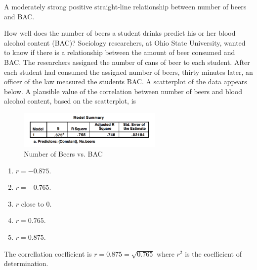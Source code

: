 \documentclass[11pt, chapterprefix=true]{scrbook}\usepackage[]{graphicx}\usepackage[]{color}
\begin{document}
\begin{exercises}
\begin{exercise}
  \end{exercise}
  \vspace{2mm}
  \begin{solution}
    A moderately strong positive straight-line relationship between number of beers and BAC.
  \end{solution}

  \begin{exercise} %

    How well does the number of beers a student drinks predict his or her
blood alcohol content (BAC)? Sociology researchers, at Ohio State University, wanted to know if there is a relationship between the amount of beer consumed and BAC. The researchers assigned the number of cans of beer to each student. After each student had consumed the assigned number of beers,  thirty minutes later, an officer of the law measured the students BAC. \cite{OSU2016}
A scatterplot of the data appears below.  A plausible value of the correlation between number of beers and blood alcohol content, based on the scatterplot, is

\begin{figure}[htbp] %
   \centering
   \includegraphics[width=7cm]{chapters/Chapter_14/ext_figure/zCorF.png}
   \caption{Number of Beers vs. BAC}
   \label{fig:f12_14}
\end{figure}

      \begin{enumerate}
      \item $r = -0.875$.
      \item $r = -0.765$.
      \item $r$ close to 0.
      \item $r = 0.765$.
      \item $r = 0.875$.
      \end{enumerate}
      \vspace{5mm}

    \end{exercise}
    \vspace{2mm}
    \begin{solution}
       The correllation coefficient is $r = 0.875 = \sqrt{0.765}$ where  $r^2$ is the coefficient of determination.
    \end{solution}



\end{exercises}
\end{document}
